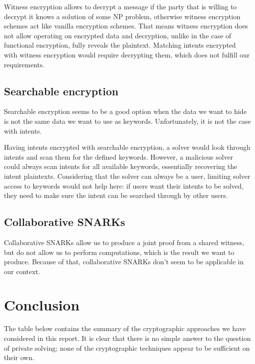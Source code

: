 \documentclass[
    9pt,            %
    report,        %
    affiltop,       %
]{art}
\begin{document}
Witness encryption allows to decrypt a message if the party that is willing to decrypt it knows a solution of some NP problem, otherwise witness encryption schemes act like vanilla encryption schemes. That means witness encryption does not allow operating on encrypted data and decryption, unlike in the case of functional encryption, fully reveals the plaintext. Matching intents encrypted with witness encryption would require decrypting them, which does not fulfill our requirements.

\subsection{Searchable encryption}\label{SE-expanded}

Searchable encryption seems to be a good option when the data we want to hide is not the same data we want to use as keywords. Unfortunately, it is not the case with intents.

Having intents encrypted with searchable encryption, a solver would look through intents and scan them for the defined keywords. However, a malicious solver could always scan intents for all available keywords, essentially recovering the intent plaintexts. Considering that the solver can always be a user, limiting solver access to keywords would not help here: if users want their intents to be solved, they need to make sure the intent can be searched through by other users. 

\subsection{Collaborative SNARKs}\label{co-SNARKs-expanded}

Collaborative SNARKs allow us to produce a joint proof from a shared witness, but do not allow us to perform computations, which is the result we want to produce. Because of that, collaborative SNARKs don't seem to be applicable in our context.

\section{Conclusion}\label{conclusion}

The table below contains the summary of the cryptographic approaches we have considered in this report. It is clear that there is no simple answer to the question of private solving; none of the cryptographic techniques appear to be sufficient on their own.
\end{document}
